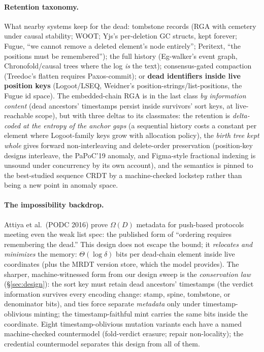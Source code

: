 \documentclass[11pt]{article}
\begin{document}
\paragraph{Retention taxonomy.} What nearby systems keep for the dead:
tombstone records (RGA with cemetery under causal stability; WOOT;
Yjs's per-deletion GC structs, kept forever; Fugue, ``we cannot
remove a deleted element's node entirely''; Peritext, ``the
positions must be remembered''); the full history (Eg-walker's event
graph, Chronofold/causal trees where the log \emph{is} the text);
consensus-gated compaction (Treedoc's flatten requires Paxos-commit);
or \textbf{dead identifiers inside live position keys} (Logoot/LSEQ,
Weidner's position-strings/list-positions, the Fugue id space). The
embedded-chain RGA is in the last class \emph{by information content}
(dead ancestors' timestamps persist inside survivors' sort keys,
at live-reachable scope), but with three deltas to its classmates:
the retention is \emph{delta-coded at the entropy of the anchor
gaps} (a sequential
history costs a constant per element where Logoot-family keys grow
with allocation policy), the \emph{birth tree kept whole} gives
forward non-interleaving and delete-order preservation (position-key
designs interleave, the PaPoC'19 anomaly, and Figma-style
fractional indexing is unsound under concurrency by its own account),
and the semantics is pinned to the best-studied sequence CRDT by a
machine-checked lockstep rather than being a new point in anomaly
space.

\paragraph{The impossibility backdrop.} Attiya et al.\ (PODC 2016)
prove $\Omega(D)$ metadata for push-based protocols meeting even the
weak list spec: the published form of ``ordering requires
remembering the dead.'' This design does not escape the bound; it
\emph{relocates and minimizes} the memory: $\Theta(\log \delta)$ bits
per dead-chain element inside live coordinates (plus the MRDT version
store, which the model provides). The sharper, machine-witnessed
form from our design sweep is the \emph{conservation law}
(\S\ref{sec:design}):
the sort key must retain dead ancestors' timestamps (the verdict
information survives every encoding change: stamp, spine, tombstone,
or denominator bits), and ties force separate \emph{metadata} only
under timestamp-oblivious minting; the timestamp-faithful mint carries
the same bits inside the coordinate. Eight timestamp-oblivious
mutation variants each have a named machine-checked countermodel
(fold-verdict erasure; repair non-locality); the credential
countermodel separates this design from all of them.
\end{document}
